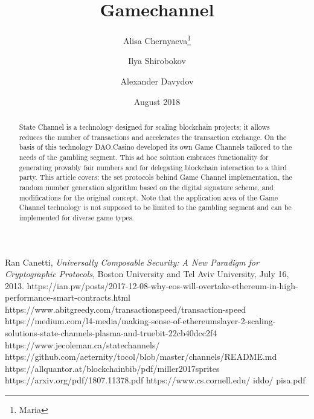 \documentclass[tikz, 12pt]{article}
\title {Gamechannel}
\author {Alisa Chernyaeva\thanks{Maria}}
\author{Ilya Shirobokov\samethanks}
\author{  Alexander Davydov\samethanks}
\affil{Research department, DAO.Casino Company}
\affil{ \href{mailto:Research@Dao.casino}{Research@Dao.casino}}
\date {August 2018}
\theoremstyle{definition}
\theoremstyle{remark}
\begin{document}
\maketitle
	\begin{abstract}
State Channel is a technology designed for scaling blockchain projects; it allows reduces the number of transactions and accelerates the transaction exchange. On the basis of this technology DAO.Casino developed its own Game Channels tailored to the needs of the gambling segment. This ad hoc solution embraces functionality for generating provably fair numbers and for delegating blockchain interaction to a third party. This article covers: the set protocols behind Game Channel implementation, the random number generation algorithm based on the digital signature scheme, and modifications for the original concept. Note that the application area of the Game Channel technology is not supposed to be limited to the gambling segment and can be implemented for diverse game types.

	\end{abstract}
\tableofcontents	
	
	
		


	\begin{thebibliography}{9}
Ran Canetti, \emph{Universally Composable Security: A New Paradigm for Cryptographic Protocols}, Boston University and Tel Aviv University, July 16, 2013.
 https://ian.pw/posts/2017-12-08-why-eos-will-overtake-ethereum-in-high-performance-smart-contracts.html
 https://www.abitgreedy.com/transactionspeed/transaction-speed
 https://medium.com/l4-media/making-sense-of-ethereumslayer-2-scaling-solutions-state-channels-plasma-and-truebit-22cb40dcc2f4
 https://www.jecoleman.ca/statechannels/
 https://github.com/aeternity/tocol/blob/master/channels/README.md
 https://allquantor.at/blockchainbib/pdf/miller2017sprites
 https://arxiv.org/pdf/1807.11378.pdf
 https://www.cs.cornell.edu/ iddo/ pisa.pdf

\end{thebibliography}


		
\end{document}
